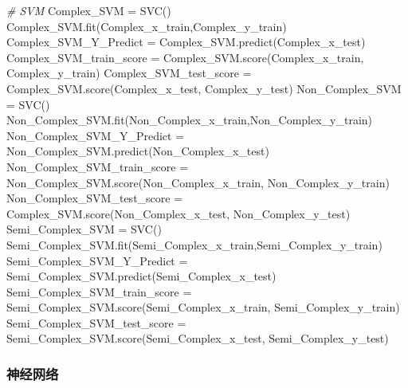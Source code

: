 \documentclass[
]{article}
\newenvironment{Shaded}{}{}
\newcommand{\CommentTok}[1]{\textcolor[rgb]{0.38,0.63,0.69}{\textit{#1}}}
\newcommand{\NormalTok}[1]{#1}
\newcommand{\OperatorTok}[1]{\textcolor[rgb]{0.40,0.40,0.40}{#1}}
\begin{document}
\begin{Shaded}
\begin{Highlighting}[]
\CommentTok{\# SVM}
\NormalTok{Complex\_SVM }\OperatorTok{=}\NormalTok{ SVC()}
\NormalTok{Complex\_SVM.fit(Complex\_x\_train,Complex\_y\_train)}
\NormalTok{Complex\_SVM\_Y\_Predict }\OperatorTok{=}\NormalTok{ Complex\_SVM.predict(Complex\_x\_test)}
\NormalTok{Complex\_SVM\_train\_score }\OperatorTok{=}\NormalTok{ Complex\_SVM.score(Complex\_x\_train, Complex\_y\_train)}
\NormalTok{Complex\_SVM\_test\_score }\OperatorTok{=}\NormalTok{ Complex\_SVM.score(Complex\_x\_test, Complex\_y\_test)}
\NormalTok{Non\_Complex\_SVM }\OperatorTok{=}\NormalTok{ SVC()}
\NormalTok{Non\_Complex\_SVM.fit(Non\_Complex\_x\_train,Non\_Complex\_y\_train)}
\NormalTok{Non\_Complex\_SVM\_Y\_Predict }\OperatorTok{=}\NormalTok{ Non\_Complex\_SVM.predict(Non\_Complex\_x\_test)}
\NormalTok{Non\_Complex\_SVM\_train\_score }\OperatorTok{=}\NormalTok{ Non\_Complex\_SVM.score(Non\_Complex\_x\_train, Non\_Complex\_y\_train)}
\NormalTok{Non\_Complex\_SVM\_test\_score }\OperatorTok{=}\NormalTok{ Complex\_SVM.score(Non\_Complex\_x\_test, Non\_Complex\_y\_test)}
\NormalTok{Semi\_Complex\_SVM }\OperatorTok{=}\NormalTok{ SVC()}
\NormalTok{Semi\_Complex\_SVM.fit(Semi\_Complex\_x\_train,Semi\_Complex\_y\_train)}
\NormalTok{Semi\_Complex\_SVM\_Y\_Predict }\OperatorTok{=}\NormalTok{ Semi\_Complex\_SVM.predict(Semi\_Complex\_x\_test)}
\NormalTok{Semi\_Complex\_SVM\_train\_score }\OperatorTok{=}\NormalTok{ Semi\_Complex\_SVM.score(Semi\_Complex\_x\_train, Semi\_Complex\_y\_train)}
\NormalTok{Semi\_Complex\_SVM\_test\_score }\OperatorTok{=}\NormalTok{ Semi\_Complex\_SVM.score(Semi\_Complex\_x\_test, Semi\_Complex\_y\_test)}
\end{Highlighting}
\end{Shaded}

\hypertarget{header-n298}{%
\subsubsection{神经网络}\label{header-n298}}
\end{document}

